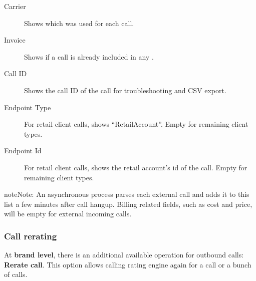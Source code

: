 \documentclass[letterpaper,10pt,english]{sphinxmanual}
\begin{document}
\begin{description}
\item[{Carrier}] \leavevmode{}\label{administration_portal/brand/calls/external_calls:term-carrier}
Shows which {\hyperref[administration_portal/brand/providers/carriers:carriers]{}} was used for
each call.

\item[{Invoice}] \leavevmode{}\label{administration_portal/brand/calls/external_calls:term-invoice}
Shows if a call is already included in any {\hyperref[administration_portal/brand/invoicing/invoices:invoices]{}}.

\item[{Call ID}] \leavevmode{}\label{administration_portal/brand/calls/external_calls:term-call-id}
Shows the call ID of the call for troubleshooting and CSV export.

\item[{Endpoint Type}] \leavevmode{}\label{administration_portal/brand/calls/external_calls:term-endpoint-type}
For retail client calls, shows ``RetailAccount''. Empty for remaining client types.

\item[{Endpoint Id}] \leavevmode{}\label{administration_portal/brand/calls/external_calls:term-endpoint-id}
For retail client calls, shows the retail account's id of the call. Empty for remaining client types.

\end{description}

\begin{notice}{note}{Note:}
An asynchronous process parses each external call and adds it to this list a few minutes after call hangup. Billing related fields, such as cost and price, will be empty for external incoming calls.
\end{notice}


\subsubsection{Call rerating}
\label{administration_portal/brand/calls/external_calls:call-rerating}
At \textbf{brand level}, there is an additional available operation for outbound calls: \textbf{Rerate call}. This option allows calling rating engine again for a call or a bunch of calls.
\end{document}
